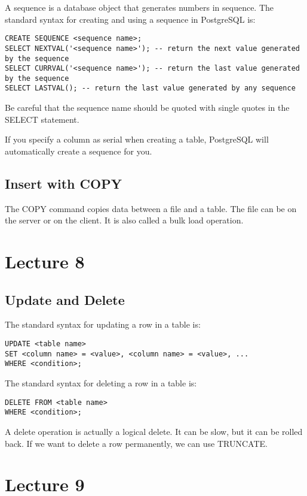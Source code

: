 \documentclass[a4paper,12pt]{article}
\begin{document}
A sequence is a database object that generates numbers in sequence.
The standard syntax for creating and using a sequence in PostgreSQL is:
\begin{verbatim}
CREATE SEQUENCE <sequence name>;
SELECT NEXTVAL('<sequence name>'); -- return the next value generated by the sequence
SELECT CURRVAL('<sequence name>'); -- return the last value generated by the sequence
SELECT LASTVAL(); -- return the last value generated by any sequence
\end{verbatim}

Be careful that the sequence name should be quoted with single quotes in the SELECT statement.

If you specify a column as serial when creating a table, PostgreSQL will automatically create a sequence for you.

\subsection{Insert with COPY}

The COPY command copies data between a file and a table.
The file can be on the server or on the client.
It is also called a bulk load operation.

\section{Lecture 8}

\subsection{Update and Delete}

The standard syntax for updating a row in a table is:
\begin{verbatim}
UPDATE <table name>
SET <column name> = <value>, <column name> = <value>, ...
WHERE <condition>;
\end{verbatim}

The standard syntax for deleting a row in a table is:
\begin{verbatim}
DELETE FROM <table name>
WHERE <condition>;
\end{verbatim}

A delete operation is actually a logical delete.
It can be slow, but it can be rolled back.
If we want to delete a row permanently, we can use TRUNCATE.

\section{Lecture 9}
\end{document}
